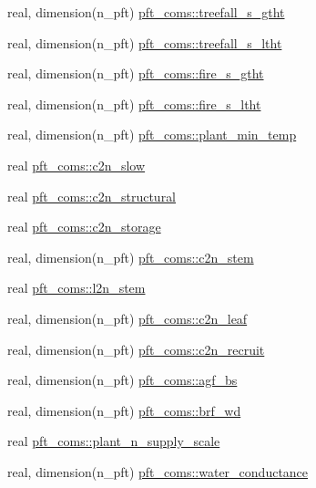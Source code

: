 \begin{DoxyCompactItemize}
real, dimension(n\+\_\+pft) \hyperlink{namespacepft__coms_a0dde76d7d9a1502fb5b2095ac6ea30fb}{pft\+\_\+coms\+::treefall\+\_\+s\+\_\+gtht}
\item 
real, dimension(n\+\_\+pft) \hyperlink{namespacepft__coms_af905b11e7eb1e1a30875d6b583839e92}{pft\+\_\+coms\+::treefall\+\_\+s\+\_\+ltht}
\item 
real, dimension(n\+\_\+pft) \hyperlink{namespacepft__coms_a41960519e8244a038e84c2fe44b9a752}{pft\+\_\+coms\+::fire\+\_\+s\+\_\+gtht}
\item 
real, dimension(n\+\_\+pft) \hyperlink{namespacepft__coms_ac154348fc689309b47112ac66a6df99d}{pft\+\_\+coms\+::fire\+\_\+s\+\_\+ltht}
\item 
real, dimension(n\+\_\+pft) \hyperlink{namespacepft__coms_ae13d0f409c782cf00abbc9f09f55a5a8}{pft\+\_\+coms\+::plant\+\_\+min\+\_\+temp}
\item 
real \hyperlink{namespacepft__coms_a4cd2632f30c0c38883e4191eb65e352b}{pft\+\_\+coms\+::c2n\+\_\+slow}
\item 
real \hyperlink{namespacepft__coms_a8ff9ca7160d6ae9774adc3a314d8accd}{pft\+\_\+coms\+::c2n\+\_\+structural}
\item 
real \hyperlink{namespacepft__coms_a2bdc4c753d41f0e863f3e00b13c8393f}{pft\+\_\+coms\+::c2n\+\_\+storage}
\item 
real, dimension(n\+\_\+pft) \hyperlink{namespacepft__coms_a45821066c1cdf886389c40c7ddbefa7f}{pft\+\_\+coms\+::c2n\+\_\+stem}
\item 
real \hyperlink{namespacepft__coms_aadbb3423514f8f93b48b2a626d4b000d}{pft\+\_\+coms\+::l2n\+\_\+stem}
\item 
real, dimension(n\+\_\+pft) \hyperlink{namespacepft__coms_a62386599b26b4cf8d478b513f813d974}{pft\+\_\+coms\+::c2n\+\_\+leaf}
\item 
real, dimension(n\+\_\+pft) \hyperlink{namespacepft__coms_ad105c123dc17ca1fb99476b476e035a4}{pft\+\_\+coms\+::c2n\+\_\+recruit}
\item 
real, dimension(n\+\_\+pft) \hyperlink{namespacepft__coms_a9d509e7c71beaa9054f49d583f01f433}{pft\+\_\+coms\+::agf\+\_\+bs}
\item 
real, dimension(n\+\_\+pft) \hyperlink{namespacepft__coms_aad5b7cd93696f04e149139562ce0f7be}{pft\+\_\+coms\+::brf\+\_\+wd}
\item 
real \hyperlink{namespacepft__coms_a519f5d42172d290ddad951a2744c5a20}{pft\+\_\+coms\+::plant\+\_\+n\+\_\+supply\+\_\+scale}
\item 
real, dimension(n\+\_\+pft) \hyperlink{namespacepft__coms_a57b4aabb4896e59800ec2159c64d06b3}{pft\+\_\+coms\+::water\+\_\+conductance}

\end{DoxyCompactItemize}
